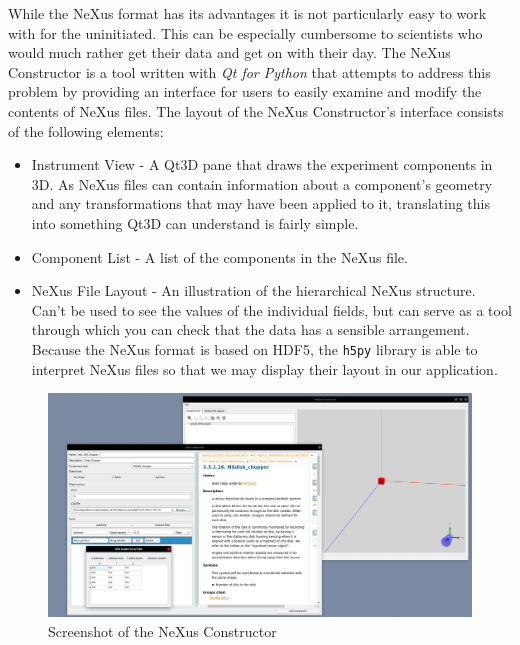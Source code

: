 While the NeXus format has its advantages it is not particularly easy to work with for the uninitiated. This can be especially cumbersome to scientists who would much rather get their data and get on with their day. The NeXus Constructor is a tool written with \textit{Qt for Python} that attempts to address this problem by providing an interface for users to easily examine and modify the contents of NeXus files. The layout of the NeXus Constructor's interface consists of the following elements:


\begin{itemize}
\item Instrument View - A Qt3D pane that draws the experiment components in 3D. As NeXus files can contain information about a component's geometry and any transformations that may have been applied to it, translating this into something Qt3D can understand is fairly simple.
\item Component List - A list of the components in the NeXus file.
\item NeXus File Layout - An illustration of the hierarchical NeXus structure. Can't be used to see the values of the individual fields, but can serve as a tool through which you can check that the data has a sensible arrangement. Because the NeXus format is based on HDF5, the \texttt{h5py} library is able to interpret NeXus files so that we may display their layout in our application.
\end{itemize}

\begin{figure}
\caption{Screenshot of the NeXus Constructor}
\includegraphics[width=\linewidth]{screenshot.png}
\end{figure}
